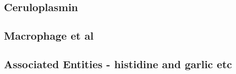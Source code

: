 \mjmlox

\subsection{ Ceruloplasmin   }

\mjmcp

\subsection{ Macrophage et al   }

\mjmmacro

\subsection{ Associated Entities - histidine and garlic etc   }

\mjmlig


